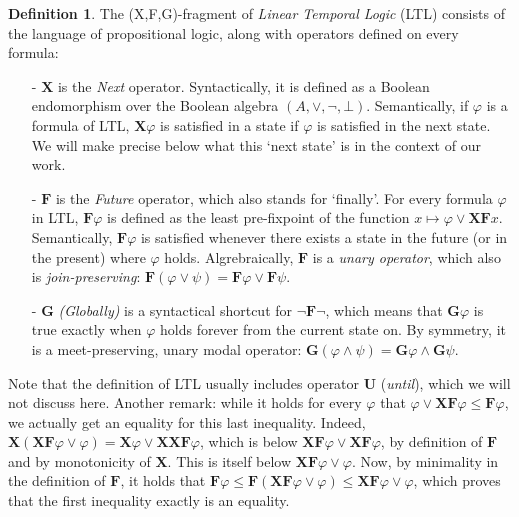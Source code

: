 \documentclass[11pt]{article}
\newcommand{\X}{{\mathbf{X}}}
\newcommand{\F}{{\mathbf{F}}}
\newcommand{\orr}{{\vee}}
\newcommand{\andd}{{\wedge}}
\newcommand{\phii}{{\varphi}}
\newcommand{\G}{{\mathbf{G}}}
\theoremstyle{definition}
\newtheorem*{definition}{Definition}
\begin{document}
\begin{definition}\label{LTL}
    The (X,F,G)-fragment of \emph{Linear Temporal Logic} (LTL) 
    consists of the language of propositional logic, along with
    operators defined on every formula:
    \begin{itemize}
        \item[-] $\X$ is the \emph{Next} operator. Syntactically, it is defined as a Boolean 
            endomorphism over the Boolean algebra $(A,\orr,\neg,\bot)$. Semantically, if $\phii$ is 
            a formula of LTL, $\X\phii$ is 
            satisfied in a state if $\phii$ is satisfied in the next state. We will make precise below what this
            `next state' is in the context of our work.
        \item[-] $\F$ is the \emph{Future} operator, which also stands for `finally'.
            For every formula $\phii$ in LTL, $\F\phii$ is defined as the least pre-fixpoint of the
            function $x\mapsto \phii\orr\X\F x$. Semantically, $\F\phii$ is satisfied whenever there
            exists a state in the future (or in the present) where $\phii$ holds. Algrebraically,
            $\F$ is a \emph{unary operator}, which also is \emph{join-preserving}:
            $\F(\phii\orr\psi)=\F\phii\orr\F\psi$.
        \item[-]$\G$ \emph{(Globally)} is a syntactical shortcut for $\neg\F\neg$, which means that $\G\phii$ is true 
            exactly when
            $\phii$ holds forever from the current state on. By symmetry, it is a meet-preserving,
            unary modal operator: $\G(\phii\andd\psi)=\G\phii\andd\G\psi$.
    \end{itemize}
\end{definition}
Note that the definition of LTL usually includes operator $\mathbf{U}$ (\emph{until}), which we will not
discuss here.
Another remark: while it holds for every $\phii$ that $\phii\orr\X\F\phii\leq\F\phii$, we actually
get an equality for this last inequality. Indeed, $\X(\X\F\phii\orr\phii)=\X\phii\orr\X\X\F\phii$,
which is below $\X\F\phii\orr\X\F\phii$, by definition of $\F$ and by monotonicity of $\X$. This
is itself below $\X\F\phii\orr\phii$. Now, by minimality in the definition of $\F$, it holds that
$\F\phii\leq\F(\X\F\phii\orr\phii)\leq\X\F\phii\orr\phii$, which proves that the first inequality
exactly is an equality.
\end{document}
